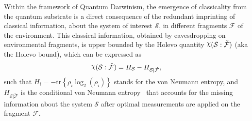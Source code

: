 \documentclass[aps,prl,showpacs,amsmath,amssymb,amsfonts,lengthcheck,onecolumn,longbibliography,superscriptaddress]{revtex4-2}
\newcommand{\trace}[1]{\mathrm{tr}\left\{#1\right\}}
\newcommand{\cS}        {{\mathcal S}}
\newcommand{\+}         {\dagger}
\newcommand\cF{{\mathcal F}}
\DeclareRobustCommand{\rchi}{{\mathpalette\irchi\relax}}
\newcommand{\irchi}[2]{\raisebox{\depth}{$#1\chi$}}
\newcommand{\mc}[1]{\mathcal{#1}}
\begin{document}
%
%
		
    
\setcounter{equation}{0}
\setcounter{figure}{0}
\setcounter{table}{0}
\setcounter{page}{1}
\makeatletter
\renewcommand{\theequation}{S\arabic{equation}}
\renewcommand{\thefigure}{S\arabic{figure}}
\renewcommand{\bibnumfmt}[1]{[R#1]}
\renewcommand{\citenumfont}[1]{R#1}
Within the framework of Quantum Darwinism, the emergence of classicality from the quantum substrate is a direct consequence of the redundant imprinting of classical information, about the system of interest $\mc{S}$, in different fragments $\mc{F}$ of the environment. This classical information, obtained by eavesdropping on environmental fragments, is upper bounded by the Holevo quantity $\rchi(\mc{S}:\check{\mc{F}})$ (aka the Holevo bound), which can be expressed as
\begin{equation}
\rchi(\cS : \check \cF)= H_\cS - H_{\cS|\check\cF},
\end{equation}
such that $H_i=-\trace{\rho_i\log_2(\rho_i)}$ stands for the von Neumann entropy, and $H_{\cS|\check\cF}$ is the conditional von Neumann entropy~\cite{nielsen2002quantum} that accounts for the missing information about the system $\cS$ after optimal measurements are applied on the fragment $\cF$.
\end{document}
